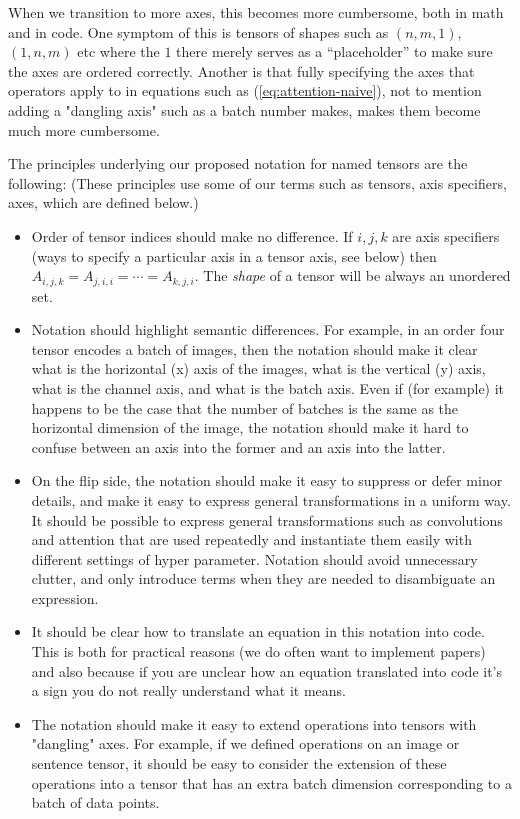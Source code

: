 \documentclass{article}
\begin{document}
When we transition to more axes, this becomes more cumbersome, both in math and in code. One symptom of this is tensors of shapes such as $(n,m,1)$, $(1,n,m)$ etc where the $1$ there merely serves as a ``placeholder'' to make sure the axes are ordered correctly.
Another is that fully specifying the axes that operators apply to in equations such as (\ref{eq:attention-naive}), not to mention  adding a "dangling axis" such as a batch number makes,  makes them become much more cumbersome.

The principles underlying our proposed notation for named tensors are the following:
(These principles use some of our terms such as tensors, axis specifiers, axes, which are defined below.) 



\begin{itemize}
  \item Order of tensor indices should make no difference. If $i,j,k$ are axis specifiers (ways to specify a particular axis in a tensor axis, see below) then $A_{i,j,k}=A_{j,i,i}=\cdots = A_{k,j,i}$. The \emph{shape} of a tensor will be always an unordered set.

  \item Notation should highlight semantic differences. For example, in an order four tensor encodes a batch of images, then the notation should make it clear what is the horizontal (x) axis of the images, what is the vertical (y) axis, what is the channel axis, and what is the batch axis. Even if (for example) it happens to be the case that the number of batches is the same as the horizontal dimension of the image, the notation should make it hard to confuse between an axis into the former and an axis into the latter.

  \item On the flip side, the notation should make it easy to suppress or defer minor details, and make it easy to express general transformations in a uniform way. It should be possible to express general transformations such as convolutions and attention that are used repeatedly and instantiate them easily with different settings of hyper parameter. Notation should avoid unnecessary clutter, and only introduce terms when they are needed to disambiguate an expression.
  
  \item It should be clear how to translate an equation in this notation into code. This is both for practical reasons (we do often want to implement papers) and also because if you are unclear how an equation translated into code it's a sign you do not really understand what it means.

  \item The notation should make it easy to extend operations into tensors with "dangling" axes. For example, if we defined operations on an image or sentence tensor, it should be easy to consider the extension of these operations into a tensor that has an extra batch dimension corresponding to a batch of data points.
  

\end{itemize}
\end{document}
